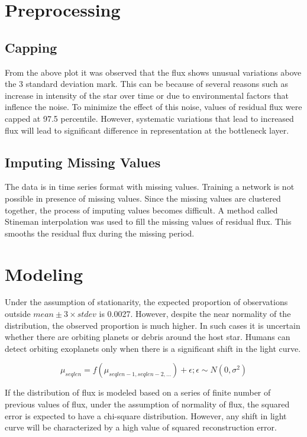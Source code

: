 \documentclass[%
aip,
amsmath,amssymb,
reprint,%
]{revtex4-1}
\begin{document}
\section{Preprocessing}

\subsection{Capping}

From the above plot it was observed that the flux shows unusual variations above the 3 standard deviation mark. This can be because of several reasons such as increase in intensity of the star over time or due to environmental factors that inflence the noise. To minimize the effect of this noise, values of residual flux were capped at 97.5 percentile. However, systematic variations that lead to increased flux will lead to significant difference in representation at the bottleneck layer.

\subsection{Imputing Missing Values}

The data is in time series format with missing values. Training a network is not possible in presence of missing values. Since the missing values are clustered together, the process of imputing values becomes difficult. A method called Stineman interpolation was used to fill the missing values of residual flux. This smooths the residual flux during the missing period.

\section{Modeling}

Under the assumption of stationarity, the expected proportion of observations outside $mean \pm 3 \times stdev$ is 0.0027. However, despite the near normality of the distribution, the observed proportion is much higher. In such cases it is uncertain whether there are orbiting planets or debris around the host star. Humans can detect orbiting exoplanets only when there is a significant shift in the light curve.

$$\mu_{seqlen} = f(\mu_{seqlen-1,seqlen-2, ...}) + \epsilon; \epsilon \sim N(0, \sigma^2)$$

If the distribution of flux is modeled based on a series of finite number of previous values of flux, under the assumption of normality of flux, the squared error is expected to have a chi-square distribution. However, any shift in light curve will be characterized by a high value of squared reconstruction error.
\end{document}

